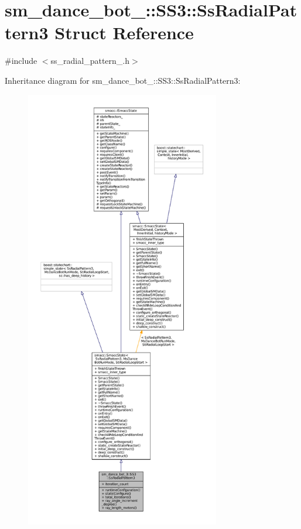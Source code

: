 \hypertarget{structsm__dance__bot__3_1_1SS3_1_1SsRadialPattern3}{}\section{sm\+\_\+dance\+\_\+bot\+\_\+:\+:S\+S3\+:\+:Ss\+Radial\+Pattern3 Struct Reference}
\label{structsm__dance__bot__3_1_1SS3_1_1SsRadialPattern3}


{\ttfamily \#include $<$ss\+\_\+radial\+\_\+pattern\+\_.\+h$>$}



Inheritance diagram for sm\+\_\+dance\+\_\+bot\+\_\+:\+:S\+S3\+:\+:Ss\+Radial\+Pattern3\+:
\nopagebreak
\begin{figure}[H]
\begin{center}
\leavevmode
\includegraphics[height=550pt]{structsm__dance__bot__3_1_1SS3_1_1SsRadialPattern3__inherit__graph}
\end{center}
\end{figure}


